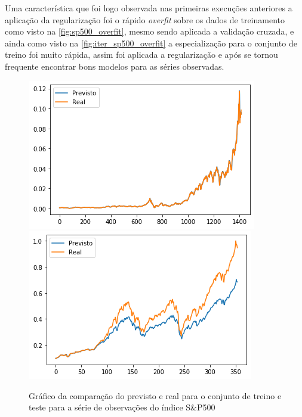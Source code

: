 \documentclass[
    12pt,
    oneside,
    a4paper,
    english,
    brazil
]{abntex2}
\begin{document}
Uma característica que foi logo  observada nas primeiras execuções anteriores a
aplicação  da regularização  foi o  rápido \textit{overfit}  sobre os  dados de
treinamento como  visto na \autoref{fig:sp500_overfit}, mesmo  sendo aplicada a
validação  cruzada, e  ainda como  visto na  \autoref{fig:iter_sp500_overfit} a
especialização para o conjunto de treino foi muito rápida, assim foi aplicada a
regularização e após se tornou frequente  encontrar bons modelos para as séries
observadas.

\begin{figure}[ht]
    \centering
    \caption{Gráfico  da  comparação  do  previsto   e  real  para  o  conjunto
    de   treino   e   teste   para   a   série   de   observações   do   índice
    S\&P500}\label{fig:sp500_overfit}
        \includegraphics[width=\linewidth]{images/sp500_overfit_train.png}
    \endminipage\hfill
        \includegraphics[width=\linewidth]{images/sp500_overfit_test.png}
    \endminipage\hfill
\end{figure}
\end{document}
